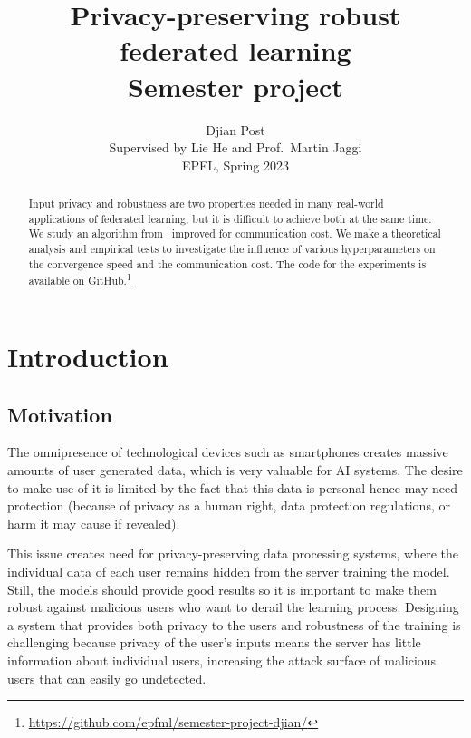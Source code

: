 \documentclass{article}
\title{
	Privacy-preserving robust federated learning \\ 
	\medskip
	{\Large Semester project}
}
\author{%
  Djian Post \smallskip \\
  Supervised by Lie He and Prof.~Martin Jaggi \smallskip \\
  EPFL, Spring 2023 \\
}
\begin{document}
\maketitle


\begin{abstract}

Input privacy and robustness are two properties needed in many real-world applications of federated learning, but it is difficult to achieve both at the same time. We study an algorithm from~\cite{LearningFromHistory} improved for communication cost. We make a theoretical analysis and empirical tests to investigate the influence of various hyperparameters on the convergence speed and the communication cost. The code for the experiments is available on GitHub.\footnote{\url{https://github.com/epfml/semester-project-djian/}}
\end{abstract}


\section{Introduction}


\subsection{Motivation}


The omnipresence of technological devices such as smartphones creates massive amounts of user generated data, which is very valuable for AI systems. The desire to make use of it is limited by the fact that this data is personal hence may need protection (because of privacy as a human right, data protection regulations, or harm it may cause if revealed). 

This issue creates need for privacy-preserving data processing systems, where the individual data of each user remains hidden from the server training the model. Still, the models should provide good results so it is important to make them robust against malicious users who want to derail the learning process. Designing a system that provides both privacy to the users and robustness of the training is challenging because privacy of the user's inputs means the server has little information about individual users, increasing the attack surface of malicious users that can easily go undetected.




\end{document}
